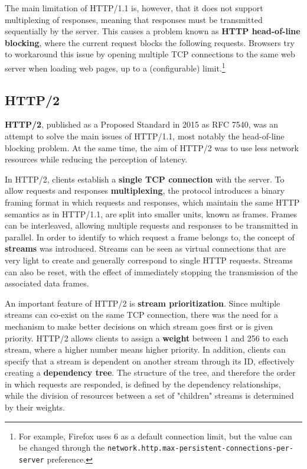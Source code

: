 The main limitation of HTTP/1.1 is, however, that it does not support multiplexing of responses, meaning that responses must be transmitted sequentially by the server. This causes a problem known as \textbf{HTTP head-of-line blocking}, where the current request blocks the following requests. Browsers try to workaround this issue by opening multiple TCP connections to the same web server when loading web pages, up to a (configurable) limit.\footnote{For example, Firefox uses 6 as a default connection limit, but the value can be changed through the \texttt{network.http.max-persistent-connections-per-server} preference.} 

\subsection{HTTP/2}
\label{sec:bg/http2}

\textbf{HTTP/2}, published as a Proposed Standard in 2015 as RFC 7540, was an attempt to solve the main issues of HTTP/1.1, most notably the head-of-line blocking problem. At the same time, the aim of HTTP/2 was to use less network resources while reducing the perception of latency.\cite{http2}

In HTTP/2, clients establish a \textbf{single TCP connection} with the server. To allow requests and responses \textbf{multiplexing}, the protocol introduces a binary framing format in which requests and responses, which maintain the same HTTP semantics as in HTTP/1.1, are split into smaller units, known as frames. Frames can be interleaved, allowing multiple requests and responses to be transmitted in parallel. In order to identify to which request a frame belongs to, the concept of \textbf{streams} was introduced. Streams can be seen as virtual connections that are very light to create and generally correspond to single HTTP requests. Streams can also be reset, with the effect of immediately stopping the transmission of the associated data frames.

An important feature of HTTP/2 is \textbf{stream prioritization}. Since multiple streams can co-exist on the same TCP connection, there was the need for a mechanism to make better decisions on which stream goes first or is given priority. HTTP/2 allows clients to assign a \textbf{weight} between 1 and 256 to each stream, where a higher number means higher priority. In addition, clients can specify that a stream is dependent on another stream through its ID, effectively creating a \textbf{dependency tree}. The structure of the tree, and therefore the order in which requests are responded, is defined by the dependency relationships, while the division of resources between a set of "children" streams is determined by their weights.

